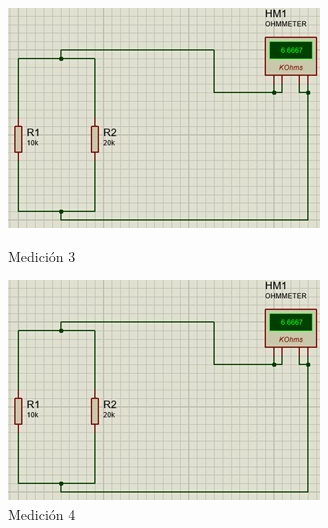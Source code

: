 	\begin{figure}[h]
		\begin{minipage}{0.5\textwidth}
			\centering
			\includegraphics[width=0.8\linewidth]{imagenes/10}
			\caption{Medición 3}
		\end{minipage}%
		\begin{minipage}{0.5\textwidth}
			\centering
			\includegraphics[width=0.8\linewidth]{imagenes/11}
			\caption{Medición 4}
		\end{minipage}
	\end{figure}
	
